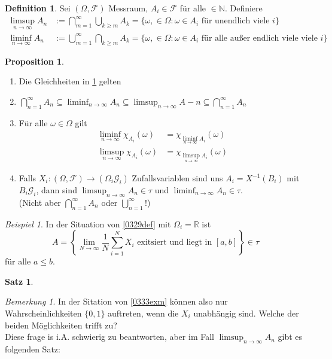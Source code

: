 \documentclass[10pt,a4paper]{article}
\newcommand{\N}{\ensuremath{\mathbb{N}}}
\newcommand{\R}{\ensuremath{\mathbb{R}}}
\newcommand{\scF}{\ensuremath{\mathscr{F}}}
\newcommand{\scG}{\mathscr G}
\theoremstyle{plain}
\newtheorem{satz}[theorem]{Satz}
\theoremstyle{definition}
\newtheorem{definition}[theorem]{Definition}
\newtheorem{prop}[theorem]{Proposition}
\theoremstyle{remark}
\newtheorem*{bem*}{Bemerkung}
\newtheorem{exm}[theorem]{Beispiel}
\begin{document}
	\begin{definition}\label{0332def}
		Sei $(\Omega,\scF)$ Messraum, $A_i\in \scF$ für alle $\in\N$. Definiere
		\begin{align*}
		\limsup_{n\to\infty}A_n&:=\bigcap_{m=1}^\infty\bigcup_{k\geq m}A_k=\{\omega,\in\Omega:\text{$\omega\in A_i$ für unendlich viele $i$}\}\\
		\liminf_{n\to\infty}A_n&:=\bigcup_{m=1}^\infty\bigcap_{k\geq m}A_k=\{\omega,\in\Omega:\text{$\omega\in A_i$ für alle außer endlich viele viele $i$}\}
		\end{align*}
	\end{definition}
	
	\begin{prop}
		\begin{enumerate}[label=\alph*)]
			\item Die Gleichheiten in \ref{0332def} gelten
			\item $\bigcap_{n=1}^\infty A_n\subseteq\liminf_{n\to\infty}A_n\subseteq\limsup_{n\to\infty}A-n\subseteq\bigcap_{n=1}^\infty A_n$
			\item Für alle $\omega\in\Omega$ gilt 
			\begin{align*}
				\liminf_{n\to\infty}\chi_{A_i}(\omega)&=\chi_{\liminf_{n\to\infty}A_i}(\omega)\\
				\limsup_{n\to\infty}\chi_{A_i}(\omega)&=\chi_{\limsup_{n\to\infty}A_i}(\omega)
			\end{align*}
			\item Falls $X_i:(\Omega,\scF)\to(\Omega_i\scG_i)$ Zufallsvariablen sind uns $A_i=X^{-1}(B_i)$ mit $B_i\scG_i$, dann sind $\limsup_{n\to\infty} A_n\in\tau$ und $\liminf_{n\to\infty}A_n\in \tau$.\\
			(Nicht aber $\bigcap_{n=1}^\infty A_n$ oder $\bigcup_{n=1}^\infty$!)
		\end{enumerate}
	\end{prop}
	
	\begin{exm}
		In der Situation von \ref{0329def} mit $\Omega_i=\R$ ist
		\[A=\left\{\lim\limits_{N\to\infty}\frac{1}{N}\sum_{i=1}^{N}X_i\text{ exitsiert und liegt in $[a,b]$}\right\}\in\tau\]
		für alle $a\leq b$.
	\end{exm}
	
	\begin{satz}
		
	\end{satz}

	\begin{bem*}
		In der Sitation von \ref{0333exm} können also nur Wahrscheinlichkeiten $\{0,1\}$ auftreten, wenn die $X_i$ unabhängig sind. Welche der beiden Möglichkeiten trifft zu?\\
		Diese frage is i.A. schwierig zu beantworten, aber im Fall $\limsup_{n\to\infty}A_n$ gibt es folgenden Satz:
	\end{bem*}
\end{document}
